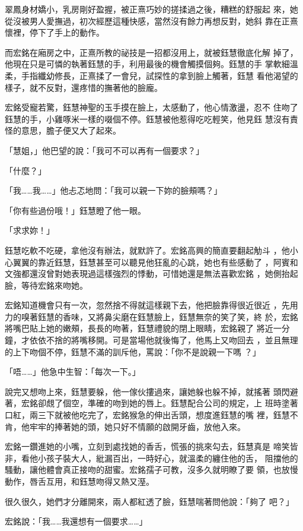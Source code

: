 翠鳳身材嬌小，乳房剛好盈握，被正熹巧妙的搓揉過之後，糟糕的舒服起
來，她從沒被男人愛撫過，初次經歷這種快感，當然沒有餘力再想反對，她斜
靠在正熹懷裡，停下了手上的動作。

而宏銘在廂房之中，正熹所教的祕技是一招都沒用上，就被鈺慧徹底化解
掉了，他現在只是可憐的執著鈺慧的手，利用最後的機會觸摸個夠。鈺慧的手
掌軟細溫柔，手指纖幼修長，正熹揉了一會兒，試探性的拿到臉上觸著，鈺慧
看他渴望的樣子，就不反對，還疼惜的撫著他的臉龐。

宏銘受寵若驚，鈺慧神聖的玉手摸在臉上，太感動了，他心情激盪，忍不
住吻了鈺慧的手，小雞啄米一樣的啜個不停。鈺慧被他惹得吃吃輕笑，他見鈺
慧沒有責怪的意思，膽子便又大了起來。

「慧姐，」他巴望的說：「我可不可以再有一個要求？」

「什麼？」

「我……我……」他忐忑地問：「我可以親一下妳的臉頰嗎？」

「你有些過份哦！」鈺慧瞪了他一眼。

「求求妳！」

鈺慧吃軟不吃硬，拿他沒有辦法，就默許了。宏銘高興的簡直要翻起觔斗
，他小心翼翼的靠近鈺慧，鈺慧甚至可以聽見他狂亂的心跳，她也有些感動了
，阿賓和文強都還沒曾對她表現過這樣強烈的悸動，可惜她還是無法喜歡宏銘
，她側抬起臉，等待宏銘來吻她。

宏銘知道機會只有一次，忽然捨不得就這樣親下去，他把臉靠得很近很近
，先用力的嗅著鈺慧的香味，又將鼻尖磨在鈺慧臉上，鈺慧無奈的笑了笑，終
於，宏銘將嘴巴貼上她的嫩頰，長長的吻著，鈺慧禮貌的閉上眼睛，宏銘親了
將近一分鐘，才依依不捨的將嘴移開。可是當場他就後悔了，他馬上又吻回去
，並且無理的上下吻個不停，鈺慧不滿的訓斥他，罵說：「你不是說親一下嗎
？」

「唔……」他急中生智：「每次一下。」

說完又想吻上來，鈺慧要躲，他一傢伙摟過來，讓她躲也躲不掉，就搖著
頭閃避著，宏銘卻覤了個空，準確的吻到她的唇上。鈺慧配合公司的規定，上
班時塗著口紅，兩三下就被他吃完了，宏銘猴急的伸出舌頭，想度進鈺慧的嘴
裡，鈺慧不肯，他牢牢的捧著她的頭，她只好不情願的啟開牙齒，放他入來。

宏銘一鑽進她的小嘴，立刻到處找她的香舌，慌張的挑來勾去，鈺慧真是
啼笑皆非，看他小孩子裝大人，紕漏百出，一時好心，就溫柔的纏住他的舌，
阻擋他的騷動，讓他體會真正接吻的甜蜜。宏銘孺子可教，沒多久就明瞭了要
領，也放慢動作，唇舌互用，和鈺慧吻得又熱又溼。

很久很久，她們才分離開來，兩人都紅透了臉，鈺慧喘著問他說：「夠了
吧？」

宏銘說：「我……我還想有一個要求……」

